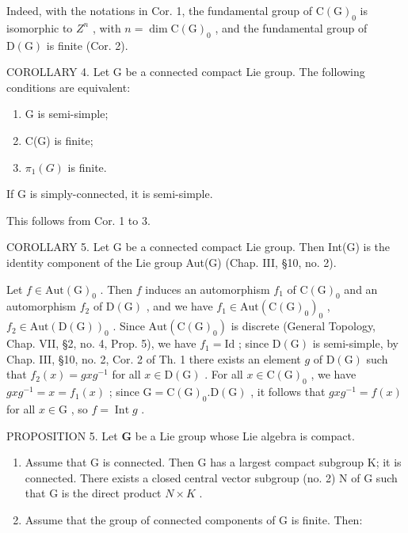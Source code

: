 Indeed, with the notations in Cor. 1, the fundamental group of \(\mathrm{C}(\mathrm{G})_{0}\) is isomorphic to \(Z^{n}\) , with \(n = \dim \mathrm{C}(\mathrm{G})_{0}\) , and the fundamental group of \(\mathrm{D}(\mathrm{G})\) is finite (Cor. 2).

COROLLARY 4. Let G be a connected compact Lie group. The following conditions are equivalent:

\begin{enumerate}
\def\labelenumi{(\roman{enumi})}
\item
  G is semi-simple;
\item
  C(G) is finite;
\item
  \(\pi_{1}(G)\) is finite.
\end{enumerate}

If \(\mathrm{G}\) is simply-connected, it is semi-simple.

This follows from Cor. 1 to 3.

COROLLARY 5. Let G be a connected compact Lie group. Then Int(G) is the identity component of the Lie group Aut(G) (Chap. III, §10, no. 2).

Let \(f \in \mathrm{Aut}(\mathrm{G})_0\) . Then \(f\) induces an automorphism \(f_1\) of \(\mathrm{C}(\mathrm{G})_0\) and an automorphism \(f_2\) of \(\mathrm{D}(\mathrm{G})\) , and we have \(f_1 \in \mathrm{Aut}(\mathrm{C}(\mathrm{G})_0)_0\) , \(f_2 \in \mathrm{Aut}(\mathrm{D}(\mathrm{G}))_0\) . Since \(\mathrm{Aut}(\mathrm{C}(\mathrm{G})_0)\) is discrete (General Topology, Chap. VII, §2, no. 4, Prop. 5), we have \(f_1 = \mathrm{Id}\) ; since \(\mathrm{D}(\mathrm{G})\) is semi-simple, by Chap. III, §10, no. 2, Cor. 2 of Th. 1 there exists an element \(g\) of \(\mathrm{D}(\mathrm{G})\) such that \(f_2(x) = g x g^{-1}\) for all \(x \in \mathrm{D}(\mathrm{G})\) . For all \(x \in \mathrm{C}(\mathrm{G})_0\) , we have \(g x g^{-1} = x = f_1(x)\) ; since \(\mathrm{G} = \mathrm{C}(\mathrm{G})_0.\mathrm{D}(\mathrm{G})\) , it follows that \(g x g^{-1} = f(x)\) for all \(x \in \mathrm{G}\) , so \(f = \operatorname{Int} g\) .

PROPOSITION 5. Let \(\mathbf{G}\) be a Lie group whose Lie algebra is compact.

\begin{enumerate}
\def\labelenumi{\alph{enumi})}
\item
  Assume that G is connected. Then G has a largest compact subgroup K; it is connected. There exists a closed central vector subgroup (no. 2) N of G such that G is the direct product \(N \times K\) .
\item
  Assume that the group of connected components of G is finite. Then:
\end{enumerate}


